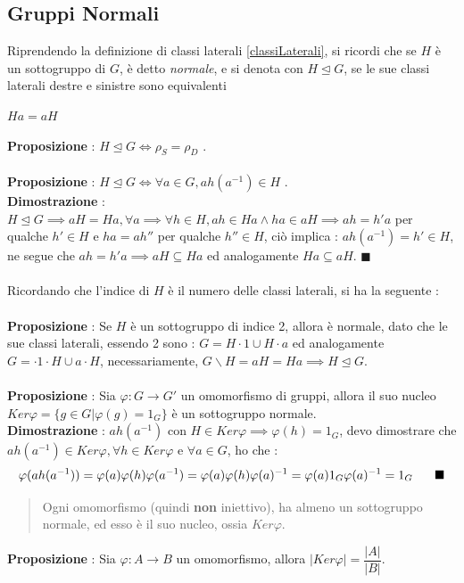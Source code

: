 \documentclass[12pt, letterpaper]{article}
\newcommand{\norm}{{\unlhd}}
\begin{document}
\subsection{Gruppi Normali}
Riprendendo la definizione di classi laterali \ref{classiLaterali}, si ricordi che se \(H\) è un sottogruppo
di \(G\), è detto \textit{normale}, e si denota con \(H\norm G\), se le sue classi laterali destre e sinistre 
sono equivalenti \begin{center}\(Ha=aH\)\end{center} 
\textbf{Proposizione }: \(H\norm G\iff \rho_S = \rho_D\) .\\\hphantom{}\\
\textbf{Proposizione }: \(H\norm G\iff \forall a \in G, ah(a^{-1})\in H\) .\\
\textbf{Dimostrazione} : \(H\norm G\implies aH=Ha, \forall a\implies \forall h\in H, ah\in Ha \land ha\in aH
\implies ah=h'a\) per qualche \(h'\in H\) e \(ha=ah''\) per qualche \(h''\in H\), ciò implica : \(ah(a^{-1})
=h'\in H\), ne segue che \(ah=h'a\implies aH\subseteq Ha\) ed analogamente \( Ha\subseteq aH\). \(\blacksquare\)
\\\hphantom{}\\ Ricordando che l'indice di \(H\) è il numero delle classi laterali, si ha la seguente :\\\hphantom{}\\
\textbf{Proposizione }: Se \(H\) è un sottogruppo di indice 2, allora è normale, dato che le sue classi laterali,
essendo 2 sono : \(G=H\cdot 1\cup H\cdot a\) ed analogamente \(G=\cdot 1\cdot H\cup a\cdot H\), necessariamente, 
\(G\backslash H=aH=Ha\implies H\norm G\).\\\hphantom{}\\
\textbf{Proposizione }: Sia \(\varphi : G \rightarrow G'\) un omomorfismo di gruppi, allora il suo nucleo  
\(Ker\varphi=\{g\in G|\varphi(g)=1_G\}\) è un sottogruppo normale.\\
\textbf{Dimostrazione} : \(ah(a^{-1})\) con \(H\in Ker\varphi\implies \varphi(h)=1_G\), devo dimostrare che
\(ah(a^{-1})\in Ker\varphi, \forall h\in Ker\varphi\) e \(\forall a \in G\), ho che : \begin{equation}
    \varphi(ah(a^{-1}))=\varphi(a)\varphi(h)\varphi(a^{-1})=\varphi(a)\varphi(h)\varphi(a)^{-1}=
    \varphi(a)1_G\varphi(a)^{-1}=1_G\text{\hphantom{text}}\blacksquare
\end{equation} 
\begin{quote}
    Ogni omomorfismo (quindi \textbf{non} iniettivo), ha almeno un sottogruppo normale, ed esso 
    è il suo nucleo, ossia \(Ker\varphi\).
\end{quote}
\textbf{Proposizione }: Sia \(\varphi : A\rightarrow B\) un omomorfismo, allora \(|Ker\varphi|=\dfrac{|A|}{|B|}\).
\end{document}
